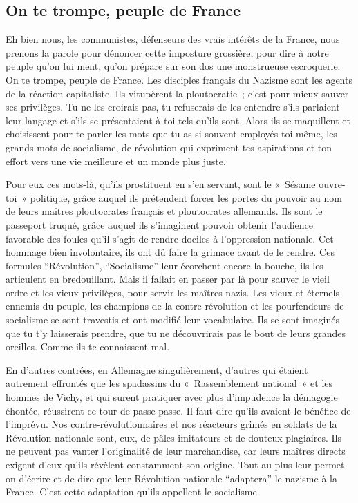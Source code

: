 \documentclass[french,twoside]{book} %
\begin{document}
\subsection[On te trompe, peuple de France]{On te trompe, peuple de France}
\noindent Eh bien nous, les communistes, défenseurs des vrais intérêts de la France, nous prenons la parole pour dénoncer cette imposture grossière, pour dire à notre peuple qu’on lui ment, qu’on prépare sur son dos une monstrueuse escroquerie. On te trompe, peuple de France. Les disciples français du Nazisme sont les agents de la réaction capitaliste. Ils vitupèrent la ploutocratie ; c’est pour mieux sauver ses privilèges. Tu ne les croirais pas, tu refuserais de les entendre s’ils parlaient leur langage et s’ils se présentaient à toi tels qu’ils sont. Alors ils se maquillent et choisissent pour te parler les mots que tu as si souvent employés toi-même, les grands mots de socialisme, de révolution qui expriment tes aspirations et ton effort vers une vie meilleure et un monde plus juste.\par
Pour eux ces mots-là, qu’ils prostituent en s’en servant, sont le « Sésame ouvre-toi » politique, grâce auquel ils prétendent forcer les portes du pouvoir au nom de leurs maîtres ploutocrates français et ploutocrates allemands. Ils sont le passeport truqué, grâce auquel ils s’imaginent pouvoir obtenir l’audience favorable des foules qu’il s’agit de rendre dociles à l’oppression nationale. Cet hommage bien involontaire, ils ont dû faire la grimace avant de le rendre. Ces formules “Révolution”, “Socialisme” leur écorchent encore la bouche, ils les articulent en bredouillant. Mais il fallait en passer par là pour sauver le vieil ordre et les vieux privilèges, pour servir les maîtres nazis. Les vieux et éternels ennemis du peuple, les champions de la contre-révolution et les pourfendeurs de socialisme se sont travestis et ont modifié leur vocabulaire. Ils se sont imaginés que tu t’y laisserais prendre, que tu ne découvrirais pas le bout de leurs grandes oreilles. Comme ils te connaissent mal.\par
En d’autres contrées, en Allemagne singulièrement, d’autres qui étaient autrement effrontés que les spadassins du « Rassemblement national » et les hommes de Vichy, et qui surent pratiquer avec plus d’impudence la démagogie éhontée, réussirent ce tour de passe-passe. Il faut dire qu’ils avaient le bénéfice de l’imprévu. Nos contre-révolutionnaires et nos réacteurs grimés en soldats de la Révolution nationale sont, eux, de pâles imitateurs et de douteux plagiaires. Ils ne peuvent pas vanter l’originalité de leur marchandise, car leurs maîtres directs exigent d’eux qu’ils révèlent constamment son origine. Tout au plus leur permet-on d’écrire et de dire que leur Révolution nationale “adaptera” le nazisme à la France. C’est cette adaptation qu’ils appellent le socialisme.
\end{document}
